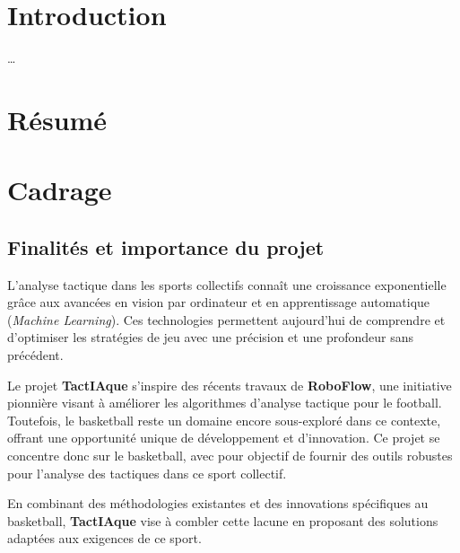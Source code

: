 \section*{Introduction}
\dots
\newpage
\section{Résumé}

\section{Cadrage}
\subsection{Finalités et importance du projet}
L’analyse tactique dans les sports collectifs connaît une croissance exponentielle grâce aux avancées en vision par ordinateur et en apprentissage automatique (\emph{Machine Learning}). Ces technologies permettent aujourd’hui de comprendre et d’optimiser les stratégies de jeu avec une précision et une profondeur sans précédent.

Le projet \textbf{TactIAque} s’inspire des récents travaux de \textbf{RoboFlow}, une initiative pionnière visant à améliorer les algorithmes d’analyse tactique pour le football. Toutefois, le basketball reste un domaine encore sous-exploré dans ce contexte, offrant une opportunité unique de développement et d’innovation. Ce projet se concentre donc sur le basketball, avec pour objectif de fournir des outils robustes pour l’analyse des tactiques dans ce sport collectif.

En combinant des méthodologies existantes et des innovations spécifiques au basketball, \textbf{TactIAque} vise à combler cette lacune en proposant des solutions adaptées aux exigences de ce sport.
